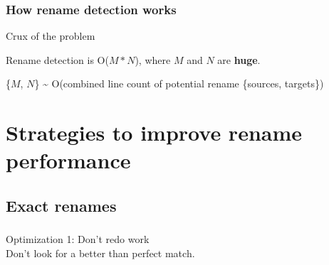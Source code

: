 \documentclass[compress,t]{beamer}
\begin{document}

\begin{frame}
  \frametitle{How rename detection works}

    \vfill

    \begin{center}
    \begin{minipage}{0.83\textwidth}
    \begin{block}{\begin{center}Crux of the problem\end{center}}
      \begin{center}
        \vspace*{1\baselineskip}

        Rename detection is O($M*N$), where $M$ and $N$
        are \textbf{huge}.

        \vspace*{2\baselineskip}

        {\scriptsize
          \{{\color{mygreen}$M$}, {\color{orange}$N$}\}
          \textasciitilde{} O(combined line count of potential rename
          \{{\color{mygreen}sources}, {\color{orange}targets}\})
        }
      \end{center}
    \end{block}
    \end{minipage}
    \end{center}

    \vfill

\end{frame}

\section[Strategies]{Strategies to improve rename performance}

\subsection[Bypassing]{Exact renames}

\begin{frame}
  \frametitle{}

  \vfill
  {\Large
  \begin{center}
    Optimization 1: Don't redo work\\
    \vspace*{\baselineskip}
    \pause
    Don't look for a better than perfect match.
  \end{center}
  }
  \vfill
\end{frame}
\end{document}
